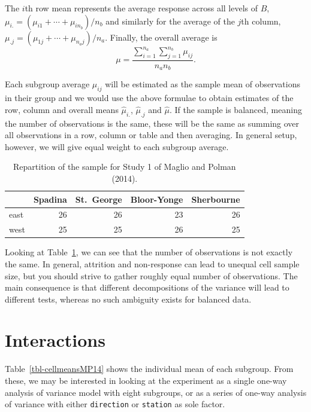 \documentclass[
  11pt,
  letterpaper,
]{scrbook}
\theoremstyle{definition}
\theoremstyle{definition}
\theoremstyle{remark}
\begin{document}
The \(i\)th row mean represents the average response across all levels
of \(B\), \(\mu_{i.} = (\mu_{i1} + \cdots + \mu_{in_b})/n_b\) and
similarly for the average of the \(j\)th column,
\(\mu_{.j} = (\mu_{1j} + \cdots + \mu_{n_aj})/n_a.\) Finally, the
overall average is
\[\mu = \frac{\sum_{i=1}^{n_a} \sum_{j=1}^{n_b} \mu_{ij}}{n_an_b}.\]

Each subgroup average \(\mu_{ij}\) will be estimated as the sample mean
of observations in their group and we would use the above formulae to
obtain estimates of the row, column and overall means
\(\widehat{\mu}_{i.}\), \(\widehat{\mu}_{.j}\) and \(\widehat{\mu}\). If
the sample is balanced, meaning the number of observations is the same,
these will be the same as summing over all observations in a row, column
or table and then averaging. In general setup, however, we will give
equal weight to each subgroup average.

\begin{longtable}[]{@{}lrrrr@{}}

\caption{\label{tbl-balance-MP14}Repartition of the sample for Study 1
of Maglio and Polman (2014).}

\tabularnewline

\toprule\noalign{}
& Spadina & St.~George & Bloor-Yonge & Sherbourne \\
\midrule\noalign{}
\endhead
\bottomrule\noalign{}
\endlastfoot
east & 26 & 26 & 23 & 26 \\
west & 25 & 25 & 26 & 25 \\

\end{longtable}

Looking at Table~\ref{tbl-balance-MP14}, we can see that the number of
observations is not exactly the same. In general, attrition and
non-response can lead to unequal cell sample size, but you should strive
to gather roughly equal number of observations. The main consequence is
that different decompositions of the variance will lead to different
tests, whereas no such ambiguity exists for balanced data.

\section{Interactions}\label{interactions}

Table~\ref{tbl-cellmeansMP14} shows the individual mean of each
subgroup. From these, we may be interested in looking at the experiment
as a single one-way analysis of variance model with eight subgroups, or
as a series of one-way analysis of variance with either
\texttt{direction} or \texttt{station} as sole factor.
\end{document}
